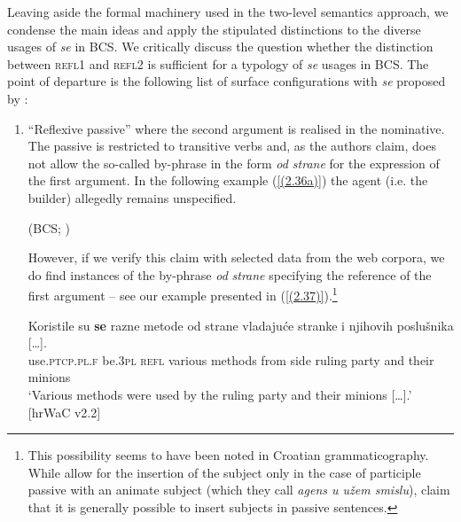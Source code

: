\largerpage
Leaving aside the formal machinery used in the two-level semantics approach, we condense the main ideas and apply the stipulated distinctions to the diverse usages of \textit{se} in BCS. We critically discuss the question whether the distinction between \textsc{refl1} and \textsc{refl2} is sufficient for a typology of \textit{se} usages in BCS. The point of departure is the following list of surface configurations with \textit{se} proposed by \citet{FJL10}:

\begin{enumerate}
\setcounter{enumi}{0}
\item ``Reflexive passive'' where the second argument is realised in the nominative. The passive is restricted to transitive verbs and, as the authors claim, does not allow the so-called by-phrase in the form \textit{od strane} for the expression of the first argument. In the following example (\ref{(2.36a)}) the agent (i.e. the builder) allegedly remains unspecified.

\begin{exe}\ex
\begin{xlist}
\strut\hfill (BCS; \citealt[205]{FJL10})
\end{xlist}
\end{exe}

\noindent However, if we verify this claim with selected data from the web corpora, we do find instances of the by-phrase \textit{od} \textit{strane} specifying the reference of the first argument – see our example presented in (\ref{(2.37)}).\footnote{This possibility seems to have been noted in Croatian grammaticography. While \citet[257]{BHMV99} allow for the insertion of the subject only in the case of participle passive with an animate subject (which they call \textit{agens u užem smislu}), \citet[318]{SilicPranjkovic07} claim that it is generally possible to insert subjects in passive sentences.}

\begin{exe}\ex\label{(2.37)}
\gll Koristile su \textbf{se} razne metode od strane vladajuće stranke i njihovih {poslušnika [\dots].} \\
 use\textsc{.ptcp.pl.f} be\textsc{.3pl}  \textsc{refl} various methods from side ruling party and their minions \\
\glt ‘Various methods were used by the ruling party and their minions [\dots].’
\hfill [hrWaC v2.2]
\end{exe}



\end{enumerate}
